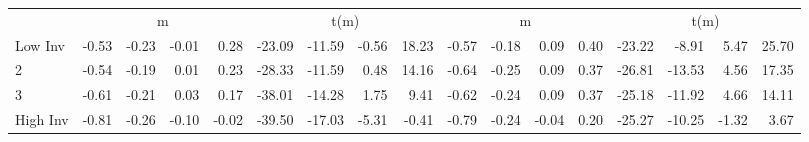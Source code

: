 \begin{table}[!ht]
\begin{tabular}{lrrrrrrrrrrrrrrrr}
  
    
      & \multicolumn{4}{c}{m} & \multicolumn{4}{c}{t(m)}
    
      & \multicolumn{4}{c}{m} & \multicolumn{4}{c}{t(m)}
    
    \\
      \cmidrule(r){2-5} \cmidrule(r){6-9} \cmidrule(r){10-13} \cmidrule(r){14-17}

    Low Inv   & -0.53  & -0.23  & -0.01  & 0.28  & -23.09  & -11.59  & -0.56  & 18.23  & -0.57  & -0.18  & 0.09  & 0.40  & -23.22  & -8.91  & 5.47  & 25.70  \\
           2  & -0.54  & -0.19  & 0.01  & 0.23  & -28.33  & -11.59  & 0.48  & 14.16  & -0.64  & -0.25  & 0.09  & 0.37  & -26.81  & -13.53  & 4.56  & 17.35  \\
           3  & -0.61  & -0.21  & 0.03  & 0.17  & -38.01  & -14.28  & 1.75  & 9.41  & -0.62  & -0.24  & 0.09  & 0.37  & -25.18  & -11.92  & 4.66  & 14.11  \\
    High Inv  & -0.81  & -0.26  & -0.10  & -0.02  & -39.50  & -17.03  & -5.31  & -0.41  & -0.79  & -0.24  & -0.04  & 0.20  & -25.27  & -10.25  & -1.32  & 3.67  \\

  

  \bottomrule
\end{tabular}
\label{tbl:32_Size_BM_Prior_C1997}
\end{table}